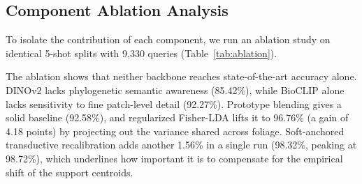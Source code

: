 \documentclass[conference]{IEEEtran}
\begin{document}
\subsection{Component Ablation Analysis}
To isolate the contribution of each component, we run an ablation study on identical 5-shot splits with 9,330 queries (Table~\ref{tab:ablation}).

\begin{table}[htbp]
\caption{Systematic Component Ablation Study (5-Shot, 9,330 Queries)}
\label{tab:ablation}
\centering
{}
\end{table}

The ablation shows that neither backbone reaches state-of-the-art accuracy alone. DINOv2 lacks phylogenetic semantic awareness (85.42\%), while BioCLIP alone lacks sensitivity to fine patch-level detail (92.27\%). Prototype blending gives a solid baseline (92.58\%), and regularized Fisher-LDA lifts it to 96.76\% (a gain of 4.18 points) by projecting out the variance shared across foliage. Soft-anchored transductive recalibration adds another 1.56\% in a single run (98.32\%, peaking at 98.72\%), which underlines how important it is to compensate for the empirical shift of the support centroids.
\end{document}
